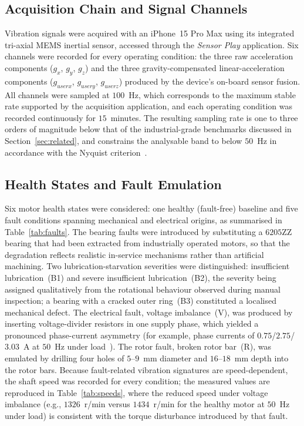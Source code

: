 \subsection{Acquisition Chain and Signal Channels}
Vibration signals were acquired with an iPhone~15 Pro Max using its integrated
tri-axial MEMS inertial sensor, accessed through the \textit{Sensor Play}
application. Six channels were recorded for every operating condition: the three
raw acceleration components ($g_x$, $g_y$, $g_z$) and the three
gravity-compensated linear-acceleration components ($g_{userx}$, $g_{usery}$,
$g_{userz}$) produced by the device's on-board sensor fusion. All channels were
sampled at $100$~Hz, which corresponds to the maximum stable rate supported by
the acquisition application, and each operating condition was recorded
continuously for $15$~minutes. The resulting sampling rate is one to three
orders of magnitude below that of the industrial-grade benchmarks discussed in
Section~\ref{sec:related}, and constrains the analysable band to below
$50$~Hz in accordance with the Nyquist criterion~\cite{nyquist1924certain,
shannon1948mathematical}.

\subsection{Health States and Fault Emulation}
Six motor health states were considered: one healthy (fault-free) baseline and
five fault conditions spanning mechanical and electrical origins, as summarised
in Table~\ref{tab:faults}. The bearing faults were introduced by substituting a
$6205$ZZ bearing that had been extracted from industrially operated motors, so
that the degradation reflects realistic in-service mechanisms rather than
artificial machining. Two lubrication-starvation severities were distinguished:
insufficient lubrication~(B1) and severe insufficient lubrication~(B2), the
severity being assigned qualitatively from the rotational behaviour observed
during manual inspection; a bearing with a cracked outer ring~(B3) constituted a
localised mechanical defect. The electrical fault, voltage imbalance~(V), was
produced by inserting voltage-divider resistors in one supply phase, which
yielded a pronounced phase-current asymmetry (for example, phase currents of
$0.75$/$2.75$/$3.03$~A at $50$~Hz under load~\cite{ertargin2026smartphone}). The
rotor fault, broken rotor bar~(R), was emulated by drilling four holes of
$5$--$9$~mm diameter and $16$--$18$~mm depth into the rotor bars. Because
fault-related vibration signatures are speed-dependent, the shaft speed was
recorded for every condition; the measured values are reproduced in
Table~\ref{tab:speeds}, where the reduced speed under voltage imbalance
(e.g., $1326$~r/min versus $1434$~r/min for the healthy motor at $50$~Hz under
load) is consistent with the torque disturbance introduced by that fault.


